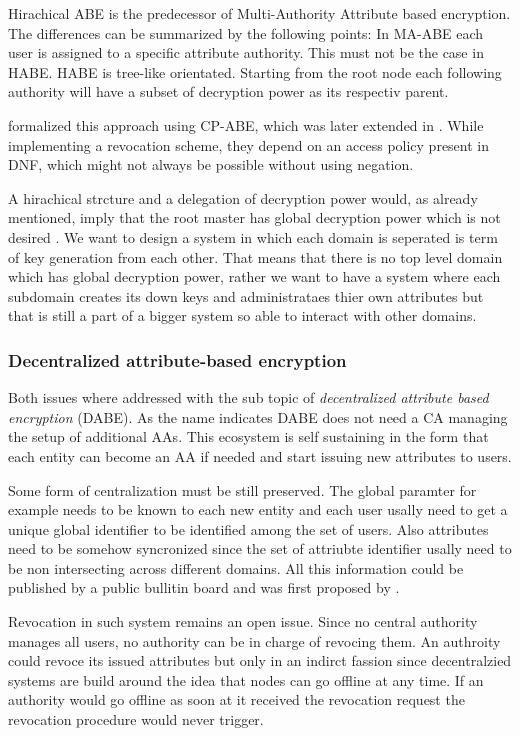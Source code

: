 Hirachical \ac{ABE} is the predecessor of Multi-Authority Attribute based encryption. The differences can be summarized by the following points: In \ac{MA-ABE} each user is assigned to a specific attribute authority. This must not be the case in \ac{HABE}. \ac{HABE} is tree-like orientated. Starting from the root node each following authority will have a subset of decryption power as its respectiv parent. 

\cite{Wang:2010:HAE:1866307.1866414} formalized this approach using \ac{CP-ABE}, which was later extended in \cite{wang2011hierarchical}. While implementing a revocation scheme, they depend on an access policy present in \ac{DNF}, which might not always be possible without using negation. 

A hirachical strcture and a delegation of decryption power would, as already mentioned, imply that the root master has global decryption power which is not desired . We want to design a system in which each domain is seperated is term of key generation from each other. That means that there is no top level domain which has global decryption power, rather we want to have a system where each subdomain creates its down keys and administrataes thier own attributes but that is still a part of a bigger system so able to interact with other domains.  

\subsubsection{Decentralized attribute-based encryption}
\label{sec:DABE}
Both issues where addressed with the sub topic of \textit{decentralized attribute based encryption} (\ac{DABE}). As the name indicates \ac{DABE} does not need a \ac{CA} managing the setup of additional \ac{AA}s. This ecosystem is self sustaining in the form that each entity can become an \ac{AA} if needed and start issuing new attributes to users. 

Some form of centralization must be still preserved. The global paramter for example needs to be known to each new entity and each user usally need to get a unique global identifier to be identified among the set of users. Also attributes need to be somehow syncronized since the set of attriubte identifier usally need to be non intersecting across different domains. All this information could be published by a public bullitin board and was first proposed by \cite{lewko2011decentralizing}. 

Revocation in such system remains an open issue. Since no central authority manages all users, no authority can be in charge of revocing them. An authroity could revoce its issued attributes but only in an indirct fassion since decentralzied systems are build around the idea that nodes can go offline at any time. If an authority would go offline as soon at it received the revocation request the revocation procedure would never trigger. 

